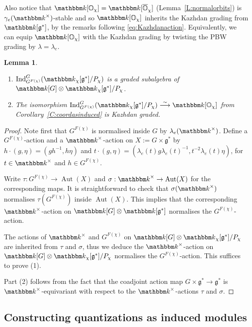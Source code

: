 \documentclass[twoside,12pt,reqno]{amsart}
\newtheorem{Lemma}[Theorem]{Lemma}
\theoremstyle{remark}
\numberwithin{equation}{section}
\def\isoto{\overset{\sim}{\longrightarrow}}
\def\k{{\mathbbm k}}
\def\Ind{\operatorname{Ind}}
\def\Aut{\operatorname{Aut}}
\def\O{{\mathbb O}}
\def\cO{{\overline{\mathbb O}}}
\def\g{{\mathfrak g}}
\begin{document}
Also notice that $\k[\O_\chi] = \k[\cO_\chi]$ (Lemma~\ref{L:normalorbits}) is $\gamma_e(\k^\times)$-stable and so $\k[\O_\chi]$ inherits the Kazhdan grading from $\k[\g^*]$, by the remarks following \eqref{eq:Kazhdanaction}. Equivalently, we can equip $\k[\O_\chi]$ with the Kazhdan grading by twisting the PBW grading by $\lambda = \lambda_e$.

\begin{Lemma}\label{L:coordgrad}\label{C:coordisom}
\begin{enumerate}
\setlength{\itemsep}{4pt}
    \item     $\Ind_{G^{F(\chi)}}^G (\k_\chi[\g^*] / P_\chi)$ is a graded subalgebra of $\k[G]\otimes \k_\chi[\g^*]/P_\chi$.
    \item The isomorphism $\Ind_{G^{F(\chi)}}^G (\k_\chi[\g^*] / P_\chi) \isoto \k[\O_\chi]$ from Corollary~\ref{C:coordasinduced} is Kazhdan graded.
\end{enumerate}

\end{Lemma}
\begin{proof}
    Note first that $G^{F(\chi)}$ is normalised inside $G$ by $\lambda_e(\k^\times)$. Define a $G^{F(\chi)}$-action and a $\k^\times$-action on $X:=G\times \g^*$ by $h\cdot(g,\eta)=(gh^{-1},h\eta)$ and $t\cdot(g,\eta)=(\lambda_e(t)g\lambda_e(t)^{-1},t^{-2}\lambda_e(t)\eta)$, for $t\in \k^\times$ and $h\in G^{F(\chi)}$. 
    
    Write $\tau:G^{F(\chi)}\to\Aut(X)$ and $\sigma:\k^\times\to \Aut(X)$ for the corresponding maps. It is straightforward to check that $\sigma(\k^\times)$ normalises $\tau(G^{F(\chi)})$ inside $\Aut(X)$. This implies that the corresponding $\k^\times$-action on $\k[G]\otimes \k[\g^*]$ normalises the $G^{F(\chi)}$-action.

    The actions of $\k^\times$ and $G^{F(\chi)}$ on $\k[G]\otimes \k_\chi[\g^*]/P_\chi$ are inherited from $\tau$ and $\sigma$, thus we deduce the $\k^\times$-action on $\k[G]\otimes \k_\chi[\g^*]/P_\chi$  normalises the $G^{F(\chi)}$-action. This suffices to prove (1).

    Part (2) follows from the fact that the coadjoint action map $G\times \g^*\to \g^*$ is $\k^\times$-equivariant with respect to the $\k^\times$-actions $\tau$ and $\sigma$.
\end{proof}






\subsection{Constructing quantizations as induced modules}\label{ss:primidlstoquants}
\end{document}
